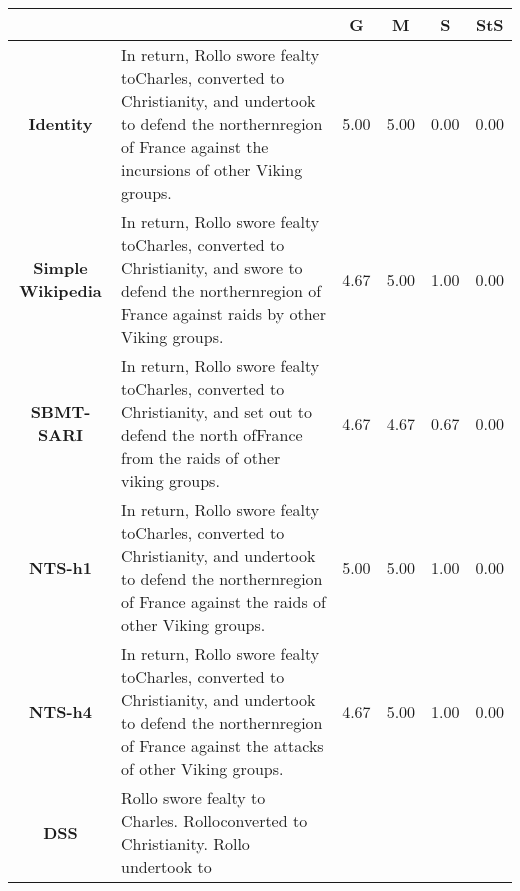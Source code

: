 \documentclass[11pt,a4paper]{article}
\begin{document}
\vspace{-0.5cm}
\begin{center}
\begin{table*}[h]
\scriptsize
\begin{center}
\setlength\tabcolsep{1pt} 
\begin{tabular}{|c|l|c|c|c|c|}
\hline
& & {\bf G} & {\bf M} & {\bf S} & {\bf StS} \\
\hline
{\bf Identity}& \parbox{0.75\linewidth}{\vspace{0.05cm} In​ return,​ Rollo​ swore​ fealty​ to​ ​Charles,​ ​converted​ ​to​ Christianity,​ ​and
​undertook​ ​to​ ​defend​ ​the​ ​northern​ ​region​ ​of​ ​France​ ​against​ ​the​ ​incursions​ ​of​ ​other
​Viking​ ​groups. \vspace{0.1cm}} & 5.00& 5.00& 0.00& 0.00\\
\hline    
{\bf Simple Wikipedia}& \parbox{0.75\linewidth}{\vspace{0.05cm} In​ return,​ Rollo​ swore​ fealty​ to​ Charles,​ ​converted​ to​ Christianity,​ ​and​ swore​ ​to
  ​defend​ ​the​ northern​ region​ of​ France​ ​against​ raids​ by​ other​ ​Viking​ groups. \vspace{0.1cm}} & 4.67 & 5.00& 1.00& 0.00\\
\hline
{\bf SBMT-SARI}& \parbox{0.75\linewidth}{\vspace{0.02cm} In​ ​return,​ ​Rollo​ ​swore​ ​fealty​ ​to​ ​Charles,​ converted​ to​ ​Christianity,​ and​ set​ out​ to
  ​defend​ ​the​ north​ of​ France​ from​ ​the​ ​raids​ ​of​ ​other​ ​viking​ ​groups. \vspace{0.1cm}} & 4.67 & 4.67 & 0.67 & 0.00\\
\hline
{\bf NTS-h1}& \parbox{0.75\linewidth}{In​ ​return,​ ​Rollo​ ​swore​ ​fealty​ ​to​ ​Charles,​ ​converted​ ​to​ ​Christianity,​ and​ ​undertook
​to​ ​defend​ the​ ​northern​ ​region​ of​ France​ ​against​ ​the​ raids​ ​of​ ​other​ ​Viking​ groups. \vspace{0.1cm}} & 5.00& 5.00& 1.00& 0.00\\
\hline
{\bf NTS-h4}& \parbox{0.75\linewidth}{​In​ ​return,​ Rollo​ ​swore​ fealty​ ​to​ ​Charles,​ ​converted​ ​to​ ​Christianity,​ ​and​ ​undertook
​to​ ​defend​ ​the​ ​northern​ ​region​ ​of​ ​France​ ​against​ ​the​ ​attacks​ ​of​ ​other​ ​Viking​ ​groups. \vspace{0.1cm}} & 4.67 & 5.00& 1.00& 0.00\\
\hline
{\bf DSS} & \parbox{0.75\linewidth}{​Rollo​ ​swore​ ​fealty​ ​to​ ​Charles.​ ​Rollo​ ​converted​ ​to​ ​Christianity.​ ​Rollo​ ​undertook​ ​to
}
\end{tabular}
\end{center}
\end{table*}
\end{center}
\end{document}

